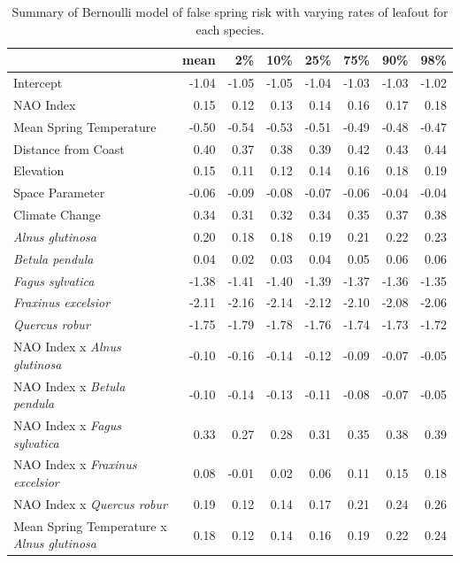 \documentclass{article}\usepackage[]{graphicx}\usepackage[]{color}
\begin{document}
\newpage
\begin{longtable}{lrrrrrrr}
\caption{Summary of Bernoulli model of false spring risk with varying rates of leafout for each species.} \\ 
  \hline
 & mean & 2\% & 10\% & 25\% & 75\% & 90\% & 98\% \\ 
  \hline \endhead  \hline
Intercept & -1.04 & -1.05 & -1.05 & -1.04 & -1.03 & -1.03 & -1.02 \\ 
  NAO Index & 0.15 & 0.12 & 0.13 & 0.14 & 0.16 & 0.17 & 0.18 \\ 
  Mean Spring 
Temperature & -0.50 & -0.54 & -0.53 & -0.51 & -0.49 & -0.48 & -0.47 \\ 
  Distance from 
Coast & 0.40 & 0.37 & 0.38 & 0.39 & 0.42 & 0.43 & 0.44 \\ 
  Elevation & 0.15 & 0.11 & 0.12 & 0.14 & 0.16 & 0.18 & 0.19 \\ 
  Space Parameter & -0.06 & -0.09 & -0.08 & -0.07 & -0.06 & -0.04 & -0.04 \\ 
  Climate Change & 0.34 & 0.31 & 0.32 & 0.34 & 0.35 & 0.37 & 0.38 \\ 
  \textit{Alnus glutinosa} & 0.20 & 0.18 & 0.18 & 0.19 & 0.21 & 0.22 & 0.23 \\ 
  \textit{Betula pendula} & 0.04 & 0.02 & 0.03 & 0.04 & 0.05 & 0.06 & 0.06 \\ 
  \textit{Fagus sylvatica} & -1.38 & -1.41 & -1.40 & -1.39 & -1.37 & -1.36 & -1.35 \\ 
  \textit{Fraxinus excelsior} & -2.11 & -2.16 & -2.14 & -2.12 & -2.10 & -2.08 & -2.06 \\ 
  \textit{Quercus robur} & -1.75 & -1.79 & -1.78 & -1.76 & -1.74 & -1.73 & -1.72 \\ 
  NAO Index
x\textit{ Alnus glutinosa} & -0.10 & -0.16 & -0.14 & -0.12 & -0.09 & -0.07 & -0.05 \\ 
  NAO Index
x\textit{ Betula pendula} & -0.10 & -0.14 & -0.13 & -0.11 & -0.08 & -0.07 & -0.05 \\ 
  NAO Index
x\textit{ Fagus sylvatica} & 0.33 & 0.27 & 0.28 & 0.31 & 0.35 & 0.38 & 0.39 \\ 
  NAO Index
x\textit{ Fraxinus excelsior} & 0.08 & -0.01 & 0.02 & 0.06 & 0.11 & 0.15 & 0.18 \\ 
  NAO Index
x\textit{ Quercus robur} & 0.19 & 0.12 & 0.14 & 0.17 & 0.21 & 0.24 & 0.26 \\ 
  Mean Spring 
Temperature
x\textit{ Alnus glutinosa} & 0.18 & 0.12 & 0.14 & 0.16 & 0.19 & 0.22 & 0.24 \\ 

\end{longtable}
\end{document}
